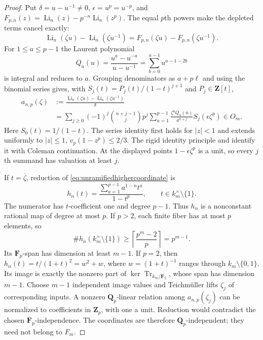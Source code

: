 \documentclass[11pt,a4paper]{article}
\theoremstyle{remark}
\newcommand{\Q}{\mathbf Q}
\newcommand{\Z}{\mathbf Z}
\newcommand{\F}{\mathbf F}
\begin{document}
\begin{proof}
Put $\delta=u-u^{-1}\ne0$, $\epsilon=u^p=u^{-p}$, and
$F_{p,n}(z)=\operatorname{Li}_n(z)-p^{-n}\operatorname{Li}_n(z^p)$.
The equal $p$th powers make the depleted terms cancel exactly:
\[
 \operatorname{Li}_n(\zeta u)-\operatorname{Li}_n(\zeta u^{-1})
 =F_{p,n}(\zeta u)-F_{p,n}(\zeta u^{-1}).
\]
For $1\leq a\leq p-1$ the Laurent polynomial
\[
 Q_a(u)=\frac{u^a-u^{-a}}{u-u^{-1}}
       =\sum_{b=0}^{a-1}u^{a-1-2b}
\]
is integral and reduces to $a$.
Grouping denominators as $a+p\ell$ and using the binomial series
gives, with $S_j(t)=P_j(t)/(1-t)^{j+1}$ and $P_j\in\Z[t]$,
\begin{equation}\label{eq:unramifiedhighercoordinate}
\begin{split}
 a_{n,p}(\zeta)
 &:=\frac{\operatorname{Li}_n(\zeta u)
                   -\operatorname{Li}_n(\zeta u^{-1})}{\delta}\\
 &=\sum_{j\geq0}(-1)^j\binom{n+j-1}{j}p^j
       \sum_{a=1}^{p-1}\frac{\zeta^aQ_a(u)}{a^{n+j}}
                              S_j(\epsilon\zeta^p)\in O_m.
\end{split}
\end{equation}
Here $S_0(t)=1/(1-t)$.
The series identity first holds for $|z|<1$ and extends uniformly
to $|z|\leq1$, $v_p(1-z^p)\leq2/3$.
The rigid identity principle and
\cite[Theorem~2.7(3)]{BesserDeJeuAlgorithm} identify it with Coleman
continuation. At the displayed points $1-\epsilon\zeta^p$ is a unit,
so every $j$th summand has valuation at least $j$.

If $t=\overline\zeta$, reduction of
\eqref{eq:unramifiedhighercoordinate} is
\[
 h_n(t)=\frac{\sum_{a=1}^{p-1}a^{1-n}t^a}{1-t^p},
 \qquad t\in k_m^\times\setminus\{1\}.
\]
The numerator has $t$-coefficient one and degree $p-1$.
Thus $h_n$ is a nonconstant rational map of degree at most $p$.
If $p>2$, each finite fiber has at most $p$ elements, so
\[
 \#h_n(k_m^\times\setminus\{1\})
 \geq\left\lceil\frac{p^m-2}{p}\right\rceil=p^{m-1}.
\]
Its $\F_p$-span has dimension at least $m-1$.
If $p=2$, then $h_n(t)=t/(1+t)^2=w^2+w$, where
$w=(1+t)^{-1}$ ranges through $k_m\setminus\{0,1\}$.
Its image is exactly the nonzero part of
$\ker\operatorname{Tr}_{k_m/\F_2}$, whose span has dimension $m-1$.
Choose $m-1$ independent image values and Teichm\"uller lifts
$\zeta_j$ of corresponding inputs.
A nonzero $\Q_p$-linear relation among $a_{n,p}(\zeta_j)$ can
be normalized to coefficients in $\Z_p$, with one a unit.
Reduction would contradict the chosen $\F_p$-independence.
The coordinates are therefore $\Q_p$-independent; they need not
belong to $F_m$.


\end{proof}
\end{document}
